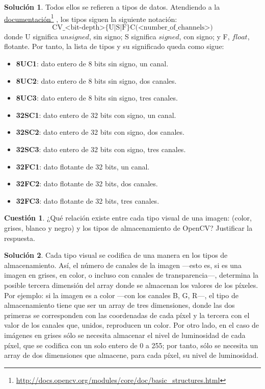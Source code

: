 \documentclass[a4paper, 11pt]{article}
\newcommand\fnurl[2]{%
  \href{#2}{#1}\footnote{\url{#2}}%
}
\theoremstyle{definition}
\newtheorem{cuestion}{Cuestión}
\newtheorem*{solucion}{Solución}
\begin{document}
  \begin{solucion}
      Todos ellos se refieren a tipos de datos. Atendiendo a la \fnurl{documentación}{http://docs.opencv.org/modules/core/doc/basic_structures.html}, los tipos siguen la siguiente notación:
      \[
      \textrm{CV\_<bit-depth>\{U|S|F\}C(<number\_of\_channels>)}
      \]
      donde U significa $unsigned$, sin signo; S significa $signed$, con signo; y F, $float$, flotante. Por tanto, la lista de tipos y su significado queda como sigue:

      \begin{itemize}
          \item \textbf{8UC1}: dato entero de 8 bits sin signo, un canal.
          \item \textbf{8UC2}: dato entero de 8 bits sin signo, dos canales.
          \item \textbf{8UC3}: dato entero de 8 bits sin signo, tres canales.
          \item \textbf{32SC1}: dato entero de 32 bits con signo, un canal.
          \item \textbf{32SC2}: dato entero de 32 bits con signo, dos canales.
          \item \textbf{32SC3}: dato entero de 32 bits con signo, tres canales.
          \item \textbf{32FC1}: dato flotante de 32 bits, un canal.
          \item \textbf{32FC2}: dato flotante de 32 bits, dos canales.
          \item \textbf{32FC3}: dato flotante de 32 bits, tres canales.
      \end{itemize}
  \end{solucion}

  \begin{cuestion}
      ¿Qué relación existe entre cada tipo visual de una imagen: (color, grises, blanco y negro) y los tipos de almacenamiento de OpenCV? Justificar la respuesta.
  \end{cuestion}

  \begin{solucion}
      Cada tipo visual se codifica de una manera en los tipos de almacenamiento. Así, el número de canales de la imagen ---esto es, si es una imagen en grises, en color, o incluso con canales de transparencia---, determina la posible tercera dimensión del array donde se almacenan los valores de los píxeles. Por ejemplo: si la imagen es a color ---con los canales B, G, R---, el tipo de almacenamiento tiene que ser un array de tres dimensiones, donde las dos primeras se corresponden con las coordenadas de cada píxel y la tercera con el valor de los canales que, unidos, reproducen un color. Por otro lado, en el caso de imágenes en grises sólo se necesita almacenar el nivel de luminosidad de cada píxel, que se codifica con un solo entero de 0 a 255; por tanto, sólo se necesita un array de dos dimensiones que almacene, para cada píxel, su nivel de luminosidad.
  \end{solucion}
\end{document}
